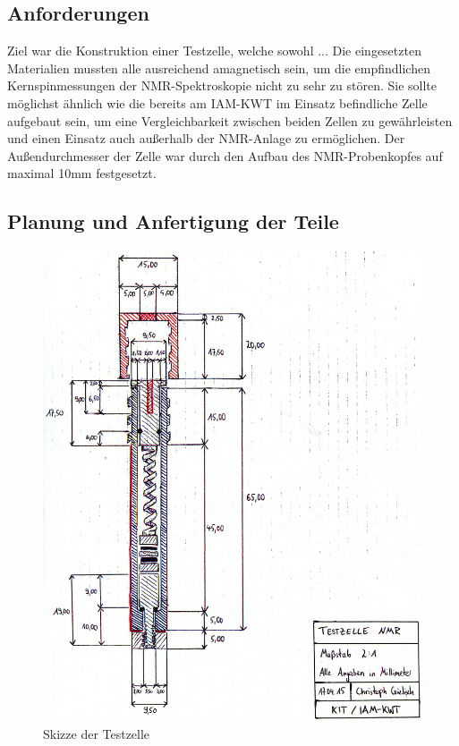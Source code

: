 \documentclass[a4paper, 11pt, headsepline,footsepline,twoside,abstract]{scrbook}
\begin{document}
\subsection{Anforderungen}
Ziel war die Konstruktion einer Testzelle, welche sowohl ... Die eingesetzten Materialien mussten alle ausreichend amagnetisch sein, um die empfindlichen Kernspinmessungen der NMR-Spektroskopie nicht zu sehr zu stören. Sie sollte möglichst ähnlich wie die bereits am IAM-KWT im Einsatz befindliche Zelle aufgebaut sein, um eine Vergleichbarkeit zwischen beiden Zellen zu gewährleisten und einen Einsatz auch außerhalb der NMR-Anlage zu ermöglichen. Der Außendurchmesser der Zelle war durch den Aufbau des NMR-Probenkopfes auf maximal 10mm festgesetzt.
\subsection{Planung und Anfertigung der Teile}
\begin{figure}
	\centering
	\includegraphics[width=1.0\columnwidth]{images/Skizze_Testzelle.jpg}
	\caption{Skizze der Testzelle}
	\label{skizze_testzelle}
\end{figure}
\end{document}
